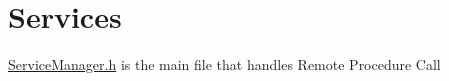 \hypertarget{ServiceManager_8h_Services}{}\section{Services}\label{ServiceManager_8h_Services}
\hyperlink{ServiceManager_8h_source}{Service\+Manager.\+h} is the main file that handles Remote Procedure Call 